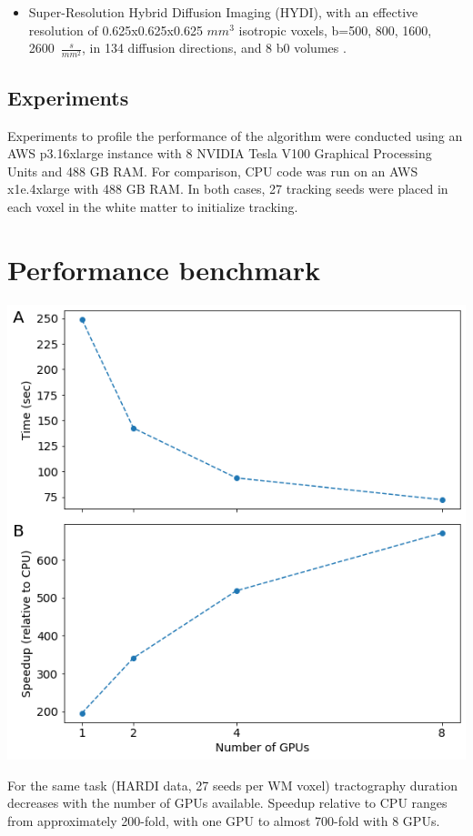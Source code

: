\documentclass[a0, landscape]{a0poster}
\begin{document}
\begin{multicols}{3}
\begin{itemize}
\item Super-Resolution Hybrid Diffusion Imaging  (HYDI), with an effective resolution of 0.625x0.625x0.625 $mm^3$ isotropic voxels, b=500, 800, 1600, 2600~$\frac{s}{mm^2}$, in 134 diffusion directions, and 8 b0 volumes \cite{elsaidsuper}.
\end{itemize}

\subsection*{Experiments}

\noindent Experiments to profile the performance of the algorithm were conducted using an AWS p3.16xlarge instance with 8 NVIDIA Tesla V100 Graphical Processing Units and 488 GB RAM. For comparison, CPU code was run on an AWS x1e.4xlarge with 488 GB RAM. In both cases, 27 tracking seeds were placed in each voxel in the white matter to initialize tracking.

\vfill
\columnbreak
\color{Navy}



\section*{Performance benchmark}

\includegraphics[width=0.8\linewidth]{benchmark.png}

For the same task (HARDI data, 27 seeds per WM voxel) tractography duration decreases with the number of GPUs available. Speedup relative to CPU ranges from approximately 200-fold, with one GPU to almost 700-fold with 8 GPUs.


\end{multicols}
\end{document}
